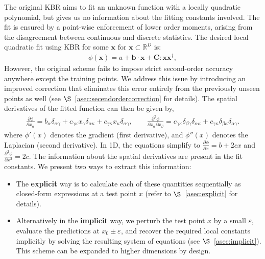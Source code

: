 \documentclass{article} %
\theoremstyle{plain}
\begin{document}
The original KBR aims to fit an unknown function with a locally quadratic polynomial, but gives us no information about the fitting constants involved. The fit is ensured by a point-wise enforcement of lower order moments, arising from the disagreement between continuous and discrete statistics. The desired local quadratic fit using KBR for some $\pmb{x}\text{ for } \pmb{x} \subset \mathbb{R}^D$ is:
\begin{gather}\label{eq:general}
    \phi(\pmb{x}) = a + \pmb{b} \cdot \pmb{x} + \pmb{C}:\pmb{x}\pmb{x}^{\dagger},
\end{gather}
However, the original scheme fails to impose strict second-order accuracy anywhere except the training points. We address this issue by introducing an improved correction that eliminates this error entirely from the previously unseen points as well (see $\S$~\ref{asec:secendordercorrection} for details). 
The spatial derivatives of the fitted function can then be given by,
\begin{gather}\label{eq:1stder}
    \frac{\partial \phi}{\partial x_\alpha  } = b_\alpha \delta_{\alpha\gamma} + c_{\gamma\kappa}x_\gamma\delta_{\alpha\kappa} + c_{\gamma\kappa}x_\kappa\delta_{\alpha\gamma}, \qquad     \frac{\partial^2 \phi}{\partial x_\alpha \partial x_\beta } = c_{\gamma\kappa}\delta_{\beta\gamma}\delta_{\alpha\kappa} + c_{\gamma\kappa}\delta_{\beta\kappa}\delta_{\alpha\gamma}.  
\end{gather}
where \( \phi'(x) \) denotes the gradient (first derivative), and \( \phi''(x) \) denotes the Laplacian (second derivative). In 1D, the equations simplify to $\frac{\partial \phi}{\partial x} = b+2cx$ and $\frac{\partial^2 \phi}{\partial x^2} = 2c$. The information about the spatial derivatives are present in the fit constants. We present two ways to extract this information: 
\begin{itemize}
    \item The \textbf{explicit} way is to calculate each of these quantities sequentially as closed-form expressions at a test point $x$ (refer to $\S$~\ref{asec:explicit} for details). 
    \item Alternatively in the \textbf{implicit} way, we perturb the test point \(x\) by a small \(\varepsilon\), evaluate the predictions at \(x_0 \pm \varepsilon\), and recover the required local constants implicitly by solving the resulting system of equations (see \(\S\)~\ref{asec:implicit}). This scheme can be expanded to higher dimensions by design.
\end{itemize}
\end{document}

